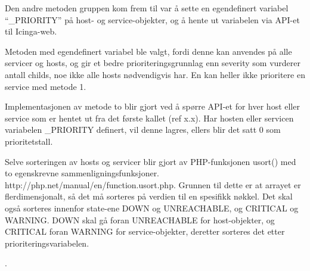 Den andre metoden gruppen kom frem til var å sette en egendefinert variabel “\_PRIORITY” på host- og service-objekter, og å hente ut variabelen via API-et til Icinga-web.

Metoden med egendefinert variabel ble valgt, fordi denne kan anvendes på alle servicer og hosts, og gir et bedre prioriteringsgrunnlag enn severity som vurderer antall childs, noe ikke alle hosts nødvendigvis har. En kan heller ikke prioritere en service med metode 1.

Implementasjonen av metode to blir gjort ved å spørre API-et for hver host eller service som er hentet ut fra det første kallet (ref x.x). Har hosten eller servicen variabelen \_PRIORITY definert, vil denne lagres, ellers blir det satt 0 som prioritetstall.

Selve sorteringen av hosts og servicer blir gjort av PHP-funksjonen usort() med to egenskrevne sammenligningsfunksjoner. http://php.net/manual/en/function.usort.php. Grunnen til dette er at arrayet er flerdimensjonalt, så det må sorteres på verdien til en spesifikk nøkkel. Det skal også sorteres innenfor state-ene DOWN og UNREACHABLE, og CRITICAL og WARNING. DOWN skal gå foran UNREACHABLE for host-objekter, og CRITICAL foran WARNING for service-objekter, deretter sorteres det etter prioriteringsvariabelen.




















































	


.
